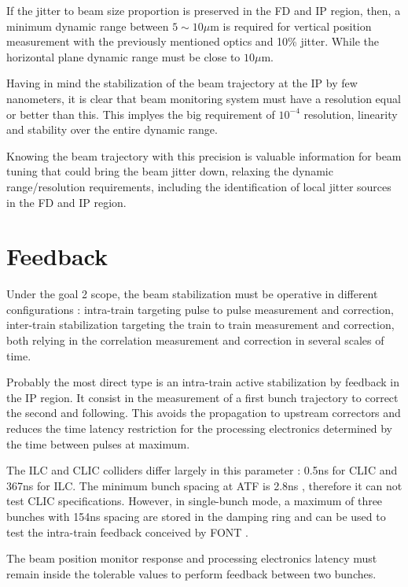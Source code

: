If the jitter to beam size proportion is preserved in the FD and IP region, then, a minimum dynamic range between $5\sim10\mu$m is required for vertical position measurement with the previously mentioned optics and 10\% jitter. While the horizontal plane dynamic range must be close to $10\mu$m.\par
Having in mind the stabilization of the beam trajectory at the IP by few nanometers, it is clear that beam monitoring system must have a resolution equal or better than this. This implyes the big requirement of $10^{-4}$ resolution, linearity and stability over the entire dynamic range.\par
Knowing the beam trajectory with this precision is valuable information for beam tuning that could bring the beam jitter down, relaxing the dynamic range/resolution requirements, including the identification of local jitter sources in the FD and IP region.\par
\section{Feedback}
Under the goal 2 scope, the beam stabilization must be operative in different configurations : intra-train targeting pulse to pulse measurement and correction, inter-train stabilization targeting the train to train measurement and correction, both relying in the correlation measurement and correction in several scales of time.\par
Probably the most direct type is an intra-train active stabilization by feedback in the IP region. It consist in the measurement of a first bunch trajectory to correct the second and following. This avoids the propagation to upstream correctors and reduces the time latency restriction for the processing electronics determined by the time between pulses at maximum.\par
The ILC and CLIC colliders differ largely in this parameter : 0.5ns for CLIC and 367ns for ILC. The minimum bunch spacing at ATF is 2.8ns \cite{ATF2prop,BurrowsIntraTrain}, therefore it can not test CLIC specifications. However, in single-bunch mode, a maximum of three bunches with 154ns spacing are stored in the damping ring and can be used to test the intra-train feedback conceived by FONT \cite{BurrowsIntraTrain2,BurrowsIntraTrain3}.\par
The beam position monitor response and processing electronics latency must remain inside the tolerable values to perform feedback between two bunches.\par

